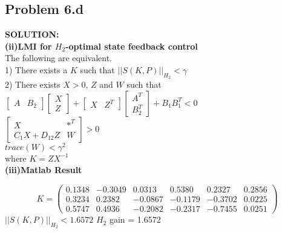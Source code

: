 \documentclass[10pt,a4paper]{article}
\begin{document}
\subsection{Problem 6.d}
\begin{tcolorbox}
\textbf{SOLUTION:}\\
\textbf{(ii)LMI for $H_2$-optimal state feedback control}\\
The following are equivalent.\\
1) There exists a $K$ such that $||S(K,P)||_{H_{2}}<\gamma$\\
2) There exists $X>0$, $Z$ and $W$ such that\\

$\begin{bmatrix} A & B_2 \end{bmatrix} \begin{bmatrix} 
X \\ Z \end{bmatrix}+ \begin{bmatrix} 
X & Z^T \end{bmatrix} \begin{bmatrix} A^T \\ B_2^T \end{bmatrix}+ B_1B_1^T <0 
$\\

$\begin{bmatrix} 
X & *^T \\ C_1X+D_{12}Z  & W \end{bmatrix} > 0 $\\
$trace(W)<\gamma^2$\\
where $K=ZX^{-1}$\\

\textbf{(iii)Matlab Result}

$$K=\left(\begin{array}{cccccc} 0.1348 & -0.3049 & 0.0313 & 0.5380 & 0.2327 & 0.2856\\ 0.3234 & 0.2382 & -0.0867 & -0.1179 & -0.3702 & 0.0225\\ 0.5747 & 0.4936 & -0.2082 & -0.2317 & -0.7455 & 0.0251 \end{array}\right)
$$
$||S(K,P)||_{H_{2}}<1.6572$
$H_2$ gain = 1.6572
\end{tcolorbox}
\end{document}
